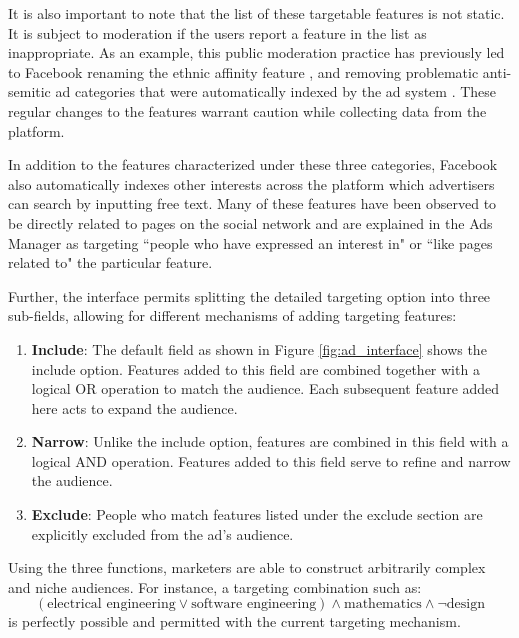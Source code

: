 It is also important to note that the list of these targetable features is not static. It is subject to moderation if the users report a feature in the list as inappropriate. As an example, this public moderation practice has previously led to Facebook renaming the ethnic affinity feature \cite{propublica_fb_ethnic_affinity_again}, and removing problematic anti-semitic ad categories that were automatically indexed by the ad system \cite{propublica_jew_hater_study}. These regular changes to the features warrant caution while collecting data from the platform.

In addition to the features characterized under these three categories, Facebook also automatically indexes other interests across the platform which advertisers can search by inputting free text. Many of these features have been observed to be directly related to pages on the social network and are explained in the Ads Manager as targeting ``people who have expressed an interest in" or ``like pages related to" the particular feature.

Further, the interface permits splitting the detailed targeting option into three sub-fields, allowing for different mechanisms of adding targeting features:

\begin{enumerate}
\item \textbf{Include}: The default field as shown in Figure \ref{fig:ad_interface} shows the include option. Features added to this field are combined together with a logical OR operation to match the audience. Each subsequent feature added here acts to expand the audience.

\item \textbf{Narrow}: Unlike the include option, features are combined in this field with a logical AND operation. Features added to this field serve to refine and narrow the audience.

\item \textbf{Exclude}: People who match features listed under the exclude section are explicitly excluded from the ad's audience.
\end{enumerate}

Using the three functions, marketers are able to construct arbitrarily complex and niche audiences. For instance, a targeting combination such as:
$$(\text{electrical engineering} \lor \text{software engineering}) \land \text{mathematics} \land \neg \text{design}$$
is perfectly possible and permitted with the current targeting mechanism.

